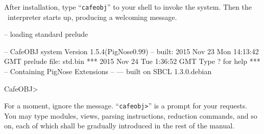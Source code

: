 \documentclass[a4paper]{memoir}
\begin{document}
After installation, type ``\verb|cafeobj|'' to your shell to
invoke the system. Then the \cafeobj~interpreter starts up, producing
a welcoming message.
%
%
%
\begin{vvtm}
\begin{ccode}
-- loading standard prelude

            -- CafeOBJ system Version 1.5.4(PigNose0.99) --
                  built: 2015 Nov 23 Mon 14:13:42 GMT
                         prelude file: std.bin
                                  ***
                      2015 Nov 24 Tue 1:36:52 GMT
                            Type ? for help
                                  ***
                  -- Containing PigNose Extensions --
                                  ---
                             built on SBCL
                             1.3.0.debian

CafeOBJ>
\end{ccode}
\end{vvtm}
For a moment, ignore the message.
``\verb|cafeobj>|'' is a prompt for your requests. You may type
modules, views, parsing instructions, reduction commands, and so on,
each of which shall be gradually introduced in the rest of the manual.
\end{document}
